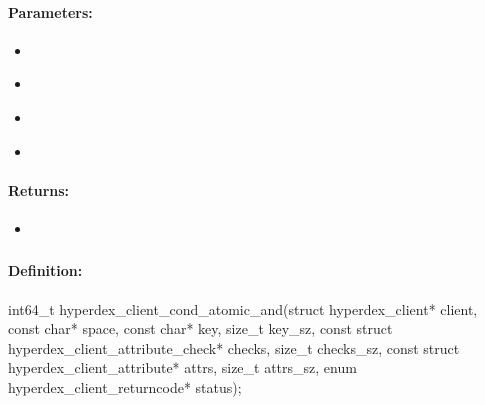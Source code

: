 \paragraph{Parameters:}
\begin{itemize}[noitemsep]
\item {}\\

\item {}\\

\item {}\\

\item {}\\

\end{itemize}

\paragraph{Returns:}
\begin{itemize}[noitemsep]
\item {}\\

\end{itemize}

\pagebreak
\subsubsection{}
\label{api:c:cond_atomic_and}


\paragraph{Definition:}
\begin{ccode}
int64_t hyperdex_client_cond_atomic_and(struct hyperdex_client* client,
        const char* space,
        const char* key, size_t key_sz,
        const struct hyperdex_client_attribute_check* checks, size_t checks_sz,
        const struct hyperdex_client_attribute* attrs, size_t attrs_sz,
        enum hyperdex_client_returncode* status);
\end{ccode}

